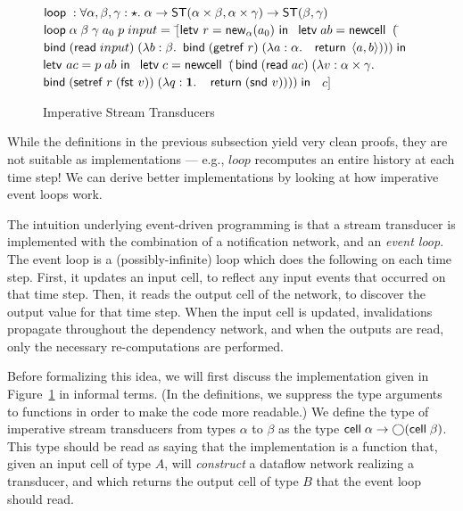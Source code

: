 \documentclass[preprint,natbib]{sigplanconf}
\begin{document}
\begin{figure}
{\begin{specification}
$\mbox{\textsf{{loop}}}\; : \forall \alpha, \beta, \gamma:\star.\; \alpha \to \mbox{\textsf{{ST}}}({\alpha\times \beta}, {\alpha\times \gamma}) \to \mbox{\textsf{{ST}}}({\beta}, {\gamma})$ \nextline
$\mbox{\textsf{{loop}}}\; \alpha\;\beta\;\gamma\;a_0\; p \; input = $ \nextline
\;\;$[$\=$\mbox{\textsf{{letv }}}r = \mbox{\textsf{{new}}}_{\alpha}(a_0)\mbox{\textsf{{ in }}}$ \nextline
    \>$\mbox{\textsf{{letv}}}\; ab = \mbox{\textsf{{newcell}}}\;\; ($\=$\mbox{\textsf{{bind}}}\; (\mbox{\textsf{{read}}}\; input)\; (\lambda b:\beta.$ \nextline
    \>                                \>$\mbox{\textsf{{bind}}}\; (\mbox{\textsf{{getref}}}\; r)\;       (\lambda a:\alpha.$ \nextline
    \>                                \>$\;\; \mbox{\textsf{{return}}}\; \left<{a},{b}\right>))) \;\mbox{\textsf{{in}}}$ \nextline
    \>$\mbox{\textsf{{letv }}}ac = p\;ab\mbox{\textsf{{ in }}}$ \nextline
    \>$\mbox{\textsf{{letv}}}\;c = \mbox{\textsf{{newcell}}}\;\; ($\=$\mbox{\textsf{{bind}}}\; (\mbox{\textsf{{read}}}\; ac) \;(\lambda v:\alpha \times \gamma.$ \nextline
    \>                              \>$\mbox{\textsf{{bind}}}\; (\mbox{\textsf{{setref}}}\; r\;(\mbox{\textsf{{fst }}} v)) \;(\lambda q:\mathbf{1}.$ \nextline
    \>                              \>$\;\;\mbox{\textsf{{return}}}\; (\mbox{\textsf{{snd }}} v))))\;\mbox{\textsf{{in}}}$ \nextline
    \>$\;\;c]$ 
\end{specification}
}
\caption{Imperative Stream Transducers}
\label{imperative-transducer-semantics}
\end{figure}

While the definitions in the previous subsection yield very clean
proofs, they are not suitable as implementations --- e.g.,
$loop$ recomputes an entire history at each time step! We can derive
better implementations by looking at how imperative event loops work.

The intuition underlying event-driven programming is that a stream
transducer is implemented with the combination of a notification
network, and an \emph{event loop}.  The event loop is a
(possibly-infinite) loop which does the following on each time
step. First, it updates an input cell, to reflect any input events
that occurred on that time step. Then, it reads the output cell of the
network, to discover the output value for that time step. When the
input cell is updated, invalidations propagate throughout the
dependency network, and when the outputs are read, only the
necessary re-computations are performed.

Before formalizing this idea, we will first discuss the implementation
given in Figure~\ref{imperative-transducer-semantics} in informal
terms.  (In the definitions, we suppress the type arguments to
functions in order to make the code more readable.) We define the type
of imperative stream transducers from types $\alpha$ to $\beta$ as the
type $\mbox{\textsf{{cell}}}\;{\alpha} \to \bigcirc{(\mbox{\textsf{{cell}}}\;{\beta})}$.  This type
should be read as saying that the implementation is a function that,
given an input cell of type $A$, will \emph{construct} a dataflow
network realizing a transducer, and which returns the output cell of
type $B$ that the event loop should read.
\end{document}
